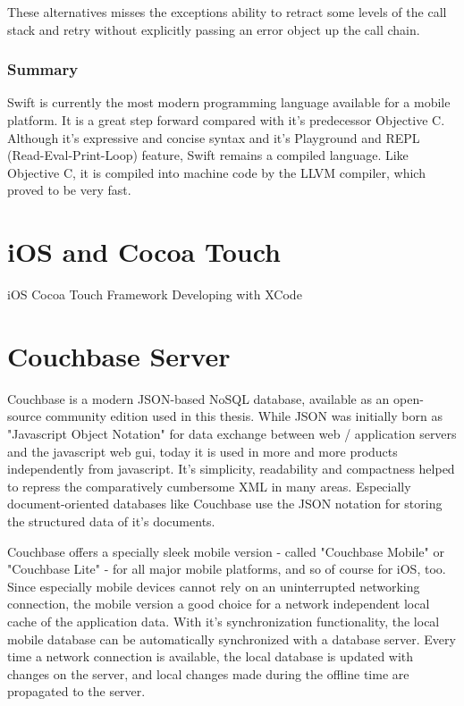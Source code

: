 These alternatives misses the exceptions ability to retract some levels of the call stack and retry without explicitly passing an error object up the call chain.

\subsubsection{Summary}

Swift is currently the most modern programming language available for a mobile platform. It is a great step forward compared with it's predecessor Objective C. 
Although it's expressive and concise syntax and it's Playground and REPL (Read-Eval-Print-Loop) feature, Swift remains a compiled language. Like Objective C, it is compiled into machine code by the LLVM compiler, which proved to be very fast.


\section{iOS and Cocoa Touch}

iOS Cocoa Touch Framework 
Developing with XCode

\section{Couchbase Server}

Couchbase is a modern JSON-based NoSQL database, available as an open-source community edition used in this thesis.\cite{Internet-couchbase} While JSON was initially born as "Javascript Object Notation" for data exchange between web / application servers and the javascript web gui, today it is used in more and more products independently from javascript. It's simplicity, readability and compactness helped to repress the comparatively cumbersome XML in many areas. Especially document-oriented databases like Couchbase use the JSON notation for storing the structured data of it's documents.

Couchbase offers a specially sleek mobile version - called "Couchbase Mobile" or "Couchbase Lite" - for all major mobile platforms, and so of course for iOS, too. Since especially mobile devices cannot rely on an uninterrupted networking connection, the mobile version a good choice for a network independent local cache of the application data. With it's synchronization functionality, the local mobile database can be automatically synchronized with a database server. Every time a network connection is available, the local database is updated with changes on the server, and local changes made during the offline time are propagated to the server.

